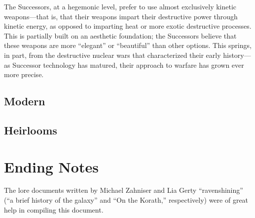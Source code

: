\documentclass[11pt]{report}
\begin{document}
    The Successors, at a hegemonic level, prefer to use almost exclusively kinetic weapons---that is, that their weapons impart their destructive power through kinetic energy, as opposed to imparting heat or more exotic destructive processes. This is partially built on an aesthetic foundation; the Successors believe that these weapons are more ``elegant'' or ``beautiful'' than other options. This springs, in part, from the destructive nuclear wars that characterized their early history---as Successor technology has matured, their approach to warfare has grown ever more precise.

    \subsection{Modern}
    \subsection{Heirlooms}
    \section{Ending Notes}
    The lore documents written by Michael Zahniser and Lia Gerty ``ravenshining'' (``a brief history of the galaxy'' and ``On the Korath,'' respectively) were of great help in compiling this document.
\end{document}
